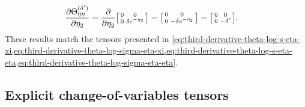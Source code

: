 \documentclass{article}
\begin{document}
\begin{align}
  \frac{\partial \Theta_{\eta\eta}^{(\delta')}}{\partial \eta_2} & = \frac{\partial}{\partial \eta_2} \begin{bsmallmatrix} 0 & 0 \\ 0 & \delta e^{-\eta_2} \end{bsmallmatrix} = \begin{bsmallmatrix} 0 & 0 \\ 0 & -\delta e^{-\eta_2} \end{bsmallmatrix} = \begin{bsmallmatrix} 0 & 0 \\ 0 & -\delta' \end{bsmallmatrix}.
\end{align}
%
These results match the tensors presented in \cref{eq:third-derivative-theta-log-s-eta-xi,eq:third-derivative-theta-log-sigma-eta-xi,eq:third-derivative-theta-log-s-eta-eta,eq:third-derivative-theta-log-sigma-eta-eta}.

\subsection{Explicit change-of-variables tensors}\label{app:explicit-change-of-vars-derivatives}
\end{document}
